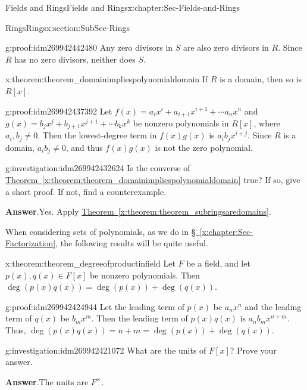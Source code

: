 \documentclass[oneside,10pt,]{book}
\numberwithin{equation}{section}
\begin{document}
\begin{chapterptx}{Fields and Rings}{}{Fields and Rings}{}{}{x:chapter:Sec-Fields-and-Rings}
\begin{sectionptx}{Rings}{}{Rings}{}{}{x:section:SubSec-Rings}
\begin{proofptx}{}{g:proof:idm269942442480}
Any zero divisors in \(S\) are also zero divisors in \(R\). Since \(R\) has no zero divisors, neither does \(S\).%
\end{proofptx}
\begin{theorem}{}{}{x:theorem:theorem_domainimpliespolynomialdomain}%
If \(R\) is a domain, then so is \(R[x]\).%
\end{theorem}
\begin{proofptx}{}{g:proof:idm269942437392}
Let \(f(x) = a_i x^i + a_{i+1} x^{i+1} + \cdots a_n x^n\) and \(g(x) = b_j x^j + b_{j+1} x^{j+1} + \cdots b_k x^k\) be nonzero polynomials in \(R[x]\), where \(a_i, b_j \ne 0\). Then the lowest-degree term in \(f(x) g(x)\) is \(a_i b_j x^{i+j}\). Since \(R\) is a domain, \(a_i b_j\ne 0\), and thus \(f(x)g(x)\) is not the zero polynomial.%
\end{proofptx}
\begin{investigation}{}{g:investigation:idm269942432624}%
Is the converse of \hyperref[x:theorem:theorem_domainimpliespolynomialdomain]{Theorem~\ref{x:theorem:theorem_domainimpliespolynomialdomain}} true? If so, give a short proof. If not, find a counterexample.%
\par\smallskip%
\noindent\textbf{Answer}.\hypertarget{g:answer:idm269942430736}{}\quad{}Yes. Apply \hyperref[x:theorem:theorem_subringsaredomains]{Theorem~\ref{x:theorem:theorem_subringsaredomains}}.%
\end{investigation}
When considering sets of polynomials, as we do in \hyperref[x:chapter:Sec-Factorization]{§~\ref{x:chapter:Sec-Factorization}}, the following results will be quite useful.%
\begin{theorem}{}{}{x:theorem:theorem_degreeofproductinfield}%
Let \(F\) be a field, and let \(p(x),q(x)\in F[x]\) be nonzero polynomials. Then \(\deg(p(x) q(x)) = \deg(p(x)) + \deg(q(x))\).%
\end{theorem}
\begin{proofptx}{}{g:proof:idm269942424944}
Let the leading term of \(p(x)\) be \(a_n x^n\) and the leading term of \(q(x)\) be \(b_m x^m\). Then the leading term of \(p(x) q(x)\) is \(a_n b_m x^{n+m}\). Thus, \(\deg(p(x) q(x)) = n+m = \deg(p(x)) + \deg(q(x))\).%
\end{proofptx}
\begin{investigation}{}{g:investigation:idm269942421072}%
What are the units of \(F[x]\)? Prove your answer.%
\par\smallskip%
\noindent\textbf{Answer}.\hypertarget{g:answer:idm269942419488}{}\quad{}The units are \(F^\times\).%
\par

\end{investigation}
\end{sectionptx}
\end{chapterptx}
\end{document}
